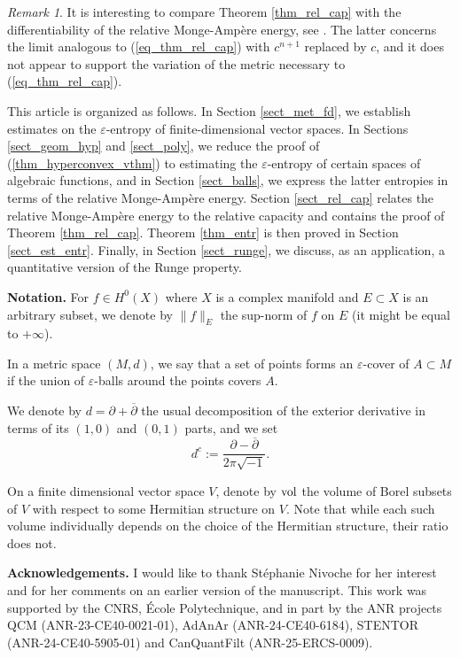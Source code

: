 \documentclass[12pt]{article}
\numberwithin{equation}{section}
\theoremstyle{theorem}
\theoremstyle{definition}
\theoremstyle{remark}
\newtheorem{rem}[thm]{Remark}
\newcommand{\imun} {\sqrt{-1}}
\newcommand{\dbar}{ \overline{\partial} }
\begin{document}
	\begin{rem}
		It is interesting to compare Theorem \ref{thm_rel_cap} with the differentiability of the relative Monge-Ampère energy, see \cite{BermanBouckBalls}.
		The latter concerns the limit analogous to (\ref{eq_thm_rel_cap}) with $c^{n+1}$ replaced by $c$, and it does not appear to support the variation of the metric necessary to (\ref{eq_thm_rel_cap}).
	\end{rem}
	\par 
	This article is organized as follows. In Section \ref{sect_met_fd}, we establish estimates on the $\varepsilon$-entropy of finite-dimensional vector spaces. 
	In Sections \ref{sect_geom_hyp} and \ref{sect_poly}, we reduce the proof of (\ref{thm_hyperconvex_vthm}) to estimating the $\varepsilon$-entropy of certain spaces of algebraic functions, and in Section \ref{sect_balls}, we express the latter entropies in terms of the relative Monge-Amp\`ere energy. 
	Section \ref{sect_rel_cap} relates the relative Monge-Amp\`ere energy to the relative capacity and contains the proof of Theorem \ref{thm_rel_cap}. 
	Theorem \ref{thm_entr} is then proved in Section \ref{sect_est_entr}. 
	Finally, in Section \ref{sect_runge}, we discuss, as an application, a quantitative 
version of the Runge property.
	\par 
	\textbf{Notation.}
	For $f \in H^0(X)$ where $X$ is a complex manifold and $E \subset X$ is an arbitrary subset, we denote by $\| f \|_E$ the sup-norm of $f$ on $E$ (it might be equal to $+\infty$).
	\par 
	In a metric space $(M, d)$, we say that a set of points forms an $\varepsilon$-cover of $A \subset M$ if the union of $\varepsilon$-balls around the points covers $A$.
	\par 
	We denote by $d = \partial + \dbar$ the usual decomposition of the exterior derivative in terms of its $(1, 0)$ and $(0, 1)$ parts, and we set 
	\begin{equation}\label{eq_defn_dc}
		d^c := \frac{\partial - \dbar}{2 \pi \imun}.
	\end{equation}
	\par 
	On a finite dimensional vector space $V$, denote by ${\rm{vol}}$ the volume of Borel subsets of $V$ with respect to some Hermitian structure on $V$.
	Note that while each such volume individually depends on the choice of the Hermitian structure, their ratio does not.
	\par
	\textbf{Acknowledgements.}
	I would like to thank St\'ephanie Nivoche for her interest and for her comments on an earlier version of the manuscript.
	This work was supported by the CNRS, École Polytechnique, and in part by the ANR projects QCM (ANR-23-CE40-0021-01), AdAnAr (ANR-24-CE40-6184), STENTOR (ANR-24-CE40-5905-01) and CanQuantFilt (ANR-25-ERCS-0009).
	
\end{document}
